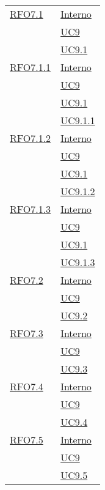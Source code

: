 \begin{longtable}{|>{\centering}m{5cm}|m{5cm}<{\centering}|}
    \hyperlink{RFO7.1}{RFO7.1} 
    & \hyperlink{Interno}{Interno}\\
  & \hyperref[UC9]{UC9}\\
   & \hyperref[UC9.1]{UC9.1}\\\hline
   
    \hyperlink{RFO7.1.1}{RFO7.1.1} 
    & \hyperlink{Interno}{Interno}\\
   & \hyperref[UC9]{UC9}\\
   & \hyperref[UC9.1]{UC9.1}\\
   & \hyperref[UC9.1.1]{UC9.1.1}\\\hline
   
   \hyperlink{RFO7.1.2}{RFO7.1.2} 
   & \hyperlink{Interno}{Interno}\\
   & \hyperref[UC9]{UC9}\\
   & \hyperref[UC9.1]{UC9.1}\\
   & \hyperref[UC9.1.2]{UC9.1.2}\\\hline
   
   \hyperlink{RFO7.1.3}{RFO7.1.3} 
   & \hyperlink{Interno}{Interno}\\
   & \hyperref[UC9]{UC9}\\
   & \hyperref[UC9.1]{UC9.1}\\
   & \hyperref[UC9.1.3]{UC9.1.3}\\\hline
   
   \hyperlink{RFO7.2}{RFO7.2} 
   & \hyperlink{Interno}{Interno}\\
   & \hyperref[UC9]{UC9}\\
   & \hyperref[UC9.2]{UC9.2}\\\hline
   
    \hyperlink{RFO7.3}{RFO7.3} 
    & \hyperlink{Interno}{Interno}\\
   & \hyperref[UC9]{UC9}\\
   & \hyperref[UC9.3]{UC9.3}\\\hline
   
   \hyperlink{RFO7.4}{RFO7.4} 
   & \hyperlink{Interno}{Interno}\\
   & \hyperref[UC9]{UC9}\\
   & \hyperref[UC9.4]{UC9.4}\\\hline
   
   \hyperlink{RFO7.5}{RFO7.5} 
   & \hyperlink{Interno}{Interno}\\
   & \hyperref[UC9]{UC9}\\
   & \hyperref[UC9.5]{UC9.5}\\\hline
   

\end{longtable}
